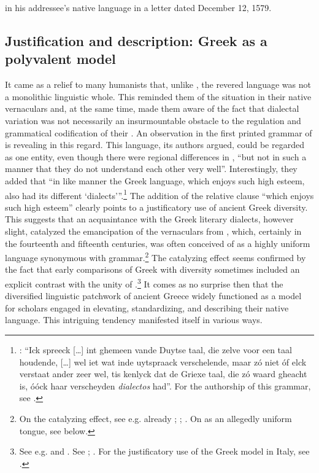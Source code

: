 in his addressee’s native  language in a letter dated December 12, 1579.

\subsection{Justification and description: Greek as a polyvalent model}\label{sec:8.1.2}

It came as a relief to many humanists that, unlike , the revered  language was not a monolithic linguistic whole. This reminded them of the situation in their native vernaculars and, at the same time, made them aware of the fact that dialectal variation was not necessarily an insurmountable obstacle to the regulation and grammatical codification of their . An observation in the first printed grammar of  is revealing in this regard. This language, its authors argued, could be regarded as one entity, even though there were regional differences in , “but not in such a manner that they do not understand each other very well”. Interestingly, they added that “in like manner the Greek language, which enjoys such high esteem, also had its different ‘dialects’”.\footnote{\citet[110]{[spieghel]1584}: “Ick spreeck […] int ghemeen vande Duytse taal, die zelve voor een taal houdende, […] wel iet wat inde uytspraack verschelende, maar zó niet óf elck verstaat ander zeer wel, tis kenlyck dat de Griexe taal, die zó waard gheacht is, óóck haar verscheyden \textit{dialectos} had”. For the authorship of this grammar, see \citet{Peeters1982}.} The addition of the relative clause “which enjoys such high esteem” clearly points to a justificatory use of ancient Greek diversity. This suggests that an acquaintance with the Greek literary dialects, however slight, catalyzed the emancipation of the vernaculars from , which, certainly in the fourteenth and fifteenth centuries, was often conceived of as a highly uniform language synonymous with grammar.\footnote{On the catalyzing effect, see e.g. already \citet[688]{Bonfante1953}; \citet[9]{Trapp1990}; \citet[67]{Rhodes2015}. On  as an allegedly uniform tongue, see  below.} The catalyzing effect seems confirmed by the fact that early comparisons of Greek with  diversity sometimes included an explicit contrast with the unity of .\footnote{See e.g. \citet[\textsc{ii}.41]{Landino1974} and \citet[*.ii\textsc{\textsuperscript{v}}]{Manutius1496Aldus}. See \citet[172--173]{Alinei1984}; \citet[209--210, 215]{Trovato1984}. For the justificatory use of the Greek model in Italy, see \citet[46, 50]{Tavoni1998}.} It comes as no surprise then that the diversified linguistic patchwork of ancient Greece widely functioned as a model for scholars engaged in elevating, standardizing, and describing their native  language. This intriguing tendency manifested itself in various ways.

